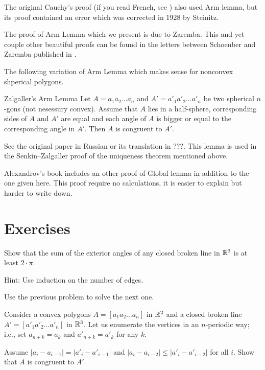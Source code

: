 The original Cauchy's proof (if you read French, see \cite{cauchy})
also used Arm lemma, 
but its proof contained an error 
which was corrected in 1928 by Steinitz.

The proof of Arm Lemma which we present is due to  Zaremba.
This and yet couple other beautiful proofs can be found in the letters between Schoenber and Zaremba published in \cite{schoenberg-zaremba}.

The following variation of Arm Lemma 
which makes sense for nonconvex shperical polygons.

\begin{thm}{Zalgaller's Arm Lemma}
Let $A=a_1a_2\dots a_n$ and $A'=a'_1a'_2\dots a'_n$ be two spherical $n$-gons (not nesessury convex).
Assume that $A$ lies in a half-sphere,
corresponding sides of $A$ and $A'$ are equal
and each angle of $A$ is bigger or equal to the corresponding angle in $A'$.
Then $A$ is congruent to $A'$.   
\end{thm}

See the original paper in Russian \cite{zalgaller} or its translation in ???.
This lemma is used in the Senkin--Zalgaller proof of the uniqueness theorem mentioned above.


Alexandrov's book includes an other proof of Global lemma in addition to the one given here.
This proof require no calculations, it is easier to explain but harder to write down.



\section*{Exercises}

\begin{pr}\label{pr:sum>1pi}
Show that the sum of the exterior angles of any closed broken line in $\mathbb{R}^3$ is at least $2\cdot\pi$.
\end{pr}

\noi Hint: Use induction on the number of edges.

Use the previous problem to solve the next one.

\begin{pr}\label{pr:aa+2} 
Consider a convex polygons $A=[a_1a_2\dots a_n]$ in $\mathbb{R}^2$ 
and a closed broken line
$A'=[a'_1a'_2\dots a'_n]$ in $\mathbb{R}^3$.
Let us enumerate the vertices in an $n$-periodic way;
i.e., set $a_{n+k}=a_k$ and $a'_{n+k}=a'_k$ for any $k$.

Assume $|a_i-a_{i-1}|=|a'_i-a'_{i-1}|$ and $|a_i-a_{i-2}|\le |a'_i-a'_{i-2}|$ for all $i$.
Show that $A$ is congruent to $A'$.
\end{pr}

